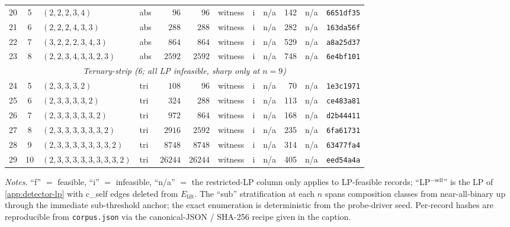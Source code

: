 \documentclass[11pt,a4paper]{article}
\theoremstyle{plain}
\theoremstyle{definition}
\begin{document}
\begin{table}[ht]
\begin{tabular}{r c l l r r l l l r l l}
20 & 5 & $(2,2,2,3,4)$       & abs & $96$   & $96$   & witness & i & n/a & 142 & n/a & \texttt{6651df35}\\
21 & 6 & $(2,2,2,4,3,3)$     & abs & $288$  & $288$  & witness & i & n/a & 282 & n/a & \texttt{163da56f}\\
22 & 7 & $(3,2,2,2,3,4,3)$   & abs & $864$  & $864$  & witness & i & n/a & 529 & n/a & \texttt{a8a25d37}\\
23 & 8 & $(2,2,3,4,3,3,2,3)$ & abs & $2592$ & $2592$ & witness & i & n/a & 748 & n/a & \texttt{6e4bf101}\\\midrule
\multicolumn{12}{c}{\emph{Ternary-strip (6; all LP infeasible, sharp only at $n = 9$)}}\\\midrule
24 & 5  & $(2,3,3,3,2)$                    & tri & $108$   & $96$    & witness & i & n/a &  70 & n/a & \texttt{1e3c1971}\\
25 & 6  & $(2,3,3,3,3,2)$                  & tri & $324$   & $288$   & witness & i & n/a & 113 & n/a & \texttt{ce483a81}\\
26 & 7  & $(2,3,3,3,3,3,2)$                & tri & $972$   & $864$   & witness & i & n/a & 168 & n/a & \texttt{d2b44411}\\
27 & 8  & $(2,3,3,3,3,3,3,2)$              & tri & $2916$  & $2592$  & witness & i & n/a & 235 & n/a & \texttt{6fa61731}\\
28 & 9  & $(2,3,3,3,3,3,3,3,2)$            & tri & $8748$  & $8748$  & witness & i & n/a & 314 & n/a & \texttt{63477fa4}\\
29 & 10 & $(2,3,3,3,3,3,3,3,3,2)$          & tri & $26244$ & $26244$ & witness & i & n/a & 405 & n/a & \texttt{eed54a4a}\\
\bottomrule
\end{tabular}

\medskip
\textit{Notes.} ``f'' $=$ feasible, ``i'' $=$ infeasible, ``n/a'' $=$
the restricted-LP column only applies to LP-feasible records;
``LP$^{-\mathrm{self}}$'' is the LP of \cref{app:detector-lp} with
c\_self edges deleted from $E_{\mathrm{lift}}$.  The ``sub''
stratification at each $n$ spans composition classes from
near-all-binary up through the immediate sub-threshold anchor; the
exact enumeration is deterministic from the probe-driver seed.
Per-record hashes are reproducible from \texttt{corpus.json} via the
canonical-JSON / SHA-256 recipe given in the caption.
\end{table}
\end{document}
